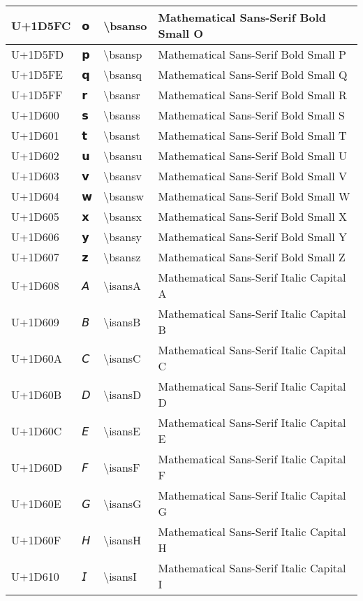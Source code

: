 \begin{table}[h]
\begin{tabulary}{\linewidth}{|L|L|L|L|}
\hline
U+1D5FC & 𝗼 & {\textbackslash}bsanso & Mathematical Sans-Serif Bold Small O \\
\hline
U+1D5FD & 𝗽 & {\textbackslash}bsansp & Mathematical Sans-Serif Bold Small P \\
\hline
U+1D5FE & 𝗾 & {\textbackslash}bsansq & Mathematical Sans-Serif Bold Small Q \\
\hline
U+1D5FF & 𝗿 & {\textbackslash}bsansr & Mathematical Sans-Serif Bold Small R \\
\hline
U+1D600 & 𝘀 & {\textbackslash}bsanss & Mathematical Sans-Serif Bold Small S \\
\hline
U+1D601 & 𝘁 & {\textbackslash}bsanst & Mathematical Sans-Serif Bold Small T \\
\hline
U+1D602 & 𝘂 & {\textbackslash}bsansu & Mathematical Sans-Serif Bold Small U \\
\hline
U+1D603 & 𝘃 & {\textbackslash}bsansv & Mathematical Sans-Serif Bold Small V \\
\hline
U+1D604 & 𝘄 & {\textbackslash}bsansw & Mathematical Sans-Serif Bold Small W \\
\hline
U+1D605 & 𝘅 & {\textbackslash}bsansx & Mathematical Sans-Serif Bold Small X \\
\hline
U+1D606 & 𝘆 & {\textbackslash}bsansy & Mathematical Sans-Serif Bold Small Y \\
\hline
U+1D607 & 𝘇 & {\textbackslash}bsansz & Mathematical Sans-Serif Bold Small Z \\
\hline
U+1D608 & 𝘈 & {\textbackslash}isansA & Mathematical Sans-Serif Italic Capital A \\
\hline
U+1D609 & 𝘉 & {\textbackslash}isansB & Mathematical Sans-Serif Italic Capital B \\
\hline
U+1D60A & 𝘊 & {\textbackslash}isansC & Mathematical Sans-Serif Italic Capital C \\
\hline
U+1D60B & 𝘋 & {\textbackslash}isansD & Mathematical Sans-Serif Italic Capital D \\
\hline
U+1D60C & 𝘌 & {\textbackslash}isansE & Mathematical Sans-Serif Italic Capital E \\
\hline
U+1D60D & 𝘍 & {\textbackslash}isansF & Mathematical Sans-Serif Italic Capital F \\
\hline
U+1D60E & 𝘎 & {\textbackslash}isansG & Mathematical Sans-Serif Italic Capital G \\
\hline
U+1D60F & 𝘏 & {\textbackslash}isansH & Mathematical Sans-Serif Italic Capital H \\
\hline
U+1D610 & 𝘐 & {\textbackslash}isansI & Mathematical Sans-Serif Italic Capital I \\

\end{tabulary}
\end{table}
